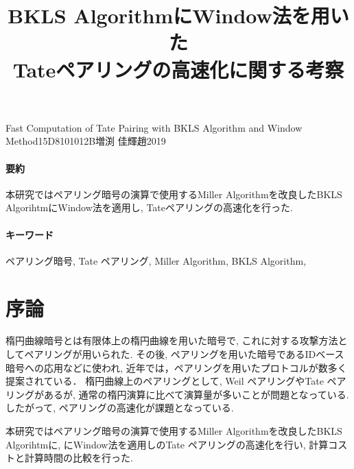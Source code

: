 \documentclass[twocolumn]{jsarticle} %
\begin{document}
\title{BKLS AlgorithmにWindow法を用いた \\ Tateペアリングの高速化に関する考察}{Fast Computation of Tate Pairing with BKLS Algorithm and Window Method}{15D8101012B}{増渕 佳輝}{趙}{2019}
\vspace{-5cm}
\paragraph{要約}
本研究ではペアリング暗号の演算で使用するMiller Algorithmを改良したBKLS AlgorihtmにWindow法を適用し, Tateペアリングの高速化を行った.
\vspace{-2mm}
\paragraph{キーワード}
ペアリング暗号, Tate ペアリング, Miller Algorithm, BKLS Algorithm,
\vspace{-5mm}
\section{序論}


楕円曲線暗号とは有限体上の楕円曲線を用いた暗号で, これに対する攻撃方法としてペアリングが用いられた. その後, ペアリングを用いた暗号であるIDベース暗号への応用などに使われ,
近年では，ペアリングを用いたプロトコルが数多く提案されている．
楕円曲線上のペアリングとして,
Weil ペアリングやTate ペアリングがあるが, 通常の楕円演算に比べて演算量が多いことが問題となっている.
したがって, ペアリングの高速化が課題となっている.
\par

本研究ではペアリング暗号の演算で使用するMiller Algorithmを改良したBKLS Algorihtmに, にWindow法を適用しのTate ペアリングの高速化を行い,  計算コストと計算時間の比較を行った.
\end{document}
